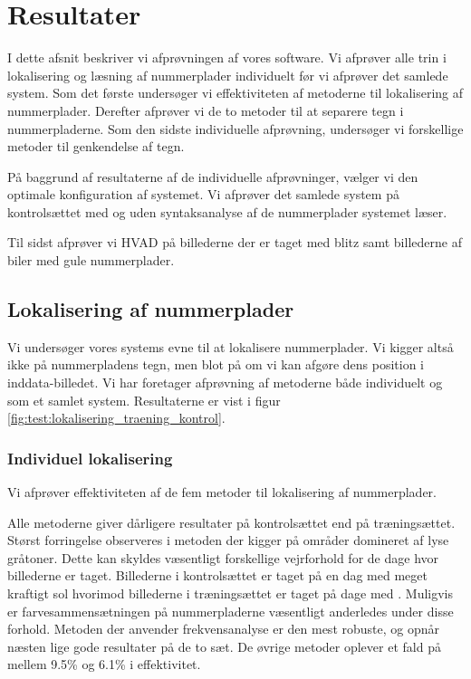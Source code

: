 \section{Resultater}
\label{sec:resultater}
I dette afsnit beskriver vi afprøvningen af vores software. Vi afprøver alle trin i lokalisering og læsning af nummerplader individuelt før vi afprøver det samlede system. Som det første undersøger vi effektiviteten af metoderne til lokalisering af nummerplader. Derefter afprøver vi de to metoder til at separere tegn i nummerpladerne. Som den sidste individuelle afprøvning, undersøger vi forskellige metoder til genkendelse af tegn.

På baggrund af resultaterne af de individuelle afprøvninger, vælger vi den optimale konfiguration af systemet. Vi afprøver det samlede system på kontrolsættet med og uden syntaksanalyse af de nummerplader systemet læser.  

Til sidst afprøver vi HVAD på billederne der er taget med blitz samt billederne af biler med gule nummerplader.


\subsection{Lokalisering af nummerplader}
Vi undersøger vores systems evne til at lokalisere nummerplader. Vi kigger altså ikke på nummerpladens tegn, men blot på om vi kan afgøre dens position i inddata-billedet. Vi har foretager afprøvning af metoderne både individuelt og som et samlet system. Resultaterne er vist i figur \vref{fig:test:lokalisering_traening_kontrol}.

\subsubsection{Individuel lokalisering}
Vi afprøver effektiviteten af de fem metoder til lokalisering af nummerplader.

Alle metoderne giver dårligere resultater på kontrolsættet end på træningsættet. Størst forringelse observeres i metoden der kigger på områder domineret af lyse gråtoner. Dette kan skyldes væsentligt forskellige vejrforhold for de dage hvor billederne er taget. Billederne i kontrolsættet er taget på en dag med meget kraftigt sol hvorimod billederne i træningsættet er taget på dage med . Muligvis er farvesammensætningen på nummerpladerne væsentligt anderledes under disse forhold.  Metoden der anvender frekvensanalyse er den mest robuste, og opnår næsten lige gode resultater på de to sæt. De øvrige metoder oplever et fald på mellem 9.5\% og 6.1\% i effektivitet.

